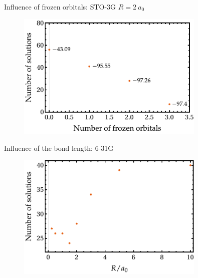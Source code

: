 \documentclass[10pt]{beamer}
\begin{document}
\begin{frame}{Influence of frozen orbitals:  STO-3G $R=2~a_0$}
  \begin{figure}
    \includegraphics[width=0.8\textwidth]{Figures/fig_3b.pdf}
  \end{figure}
\end{frame}

\begin{frame}{Influence of the bond length:  6-31G}
  \begin{figure}
    \includegraphics[width=0.8\textwidth]{Figures/fig_3c.pdf}
  \end{figure}
\end{frame}
\end{document}
